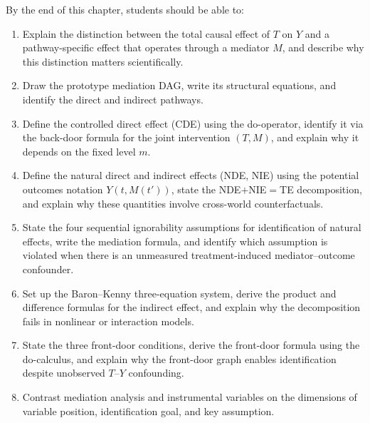 \documentclass[master.tex]{subfiles}
\begin{document}

\begin{tcolorbox}[defstyle, title={Learning Objectives}]
By the end of this chapter, students should be able to:
\begin{enumerate}
  \item Explain the distinction between the total causal effect of $T$ on
    $Y$ and a pathway-specific effect that operates through a mediator $M$,
    and describe why this distinction matters scientifically.
  \item Draw the prototype mediation DAG, write its structural equations,
    and identify the direct and indirect pathways.
  \item Define the controlled direct effect (CDE) using the do-operator,
    identify it via the back-door formula for the joint intervention
    $(T, M)$, and explain why it depends on the fixed level $m$.
  \item Define the natural direct and indirect effects (NDE, NIE) using
    the potential outcomes notation $Y(t, M(t'))$, state the
    NDE$+$NIE$=$TE decomposition, and explain why these quantities involve
    cross-world counterfactuals.
  \item State the four sequential ignorability assumptions for
    identification of natural effects, write the mediation formula, and
    identify which assumption is violated when there is an unmeasured
    treatment-induced mediator--outcome confounder.
  \item Set up the Baron--Kenny three-equation system, derive the product
    and difference formulas for the indirect effect, and explain why the
    decomposition fails in nonlinear or interaction models.
  \item State the three front-door conditions, derive the front-door
    formula using the do-calculus, and explain why the front-door graph
    enables identification despite unobserved $T$--$Y$ confounding.
  \item Contrast mediation analysis and instrumental variables on the
    dimensions of variable position, identification goal, and key
    assumption.
\end{enumerate}
\end{tcolorbox}
\end{document}
